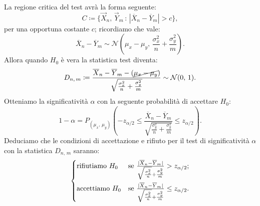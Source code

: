 \begin{defn}[$\mu_x=\mu_y=\,?,\, \sigma^2_x=\sigma^2_{x,\,0},\, \sigma^2_y=\sigma^2_{y,\,0}$]
            La regione critica del test avrà la forma seguente: \[
                C \coloneqq \big\{\vec{X}_n,\, \vec{Y}_m \,:\, |\overline{X}_n - \overline{Y}_m| > c\big\}
            ,\] per una opportuna costante $c$; ricordiamo che vale: \[
                \overline{X}_n -\overline{Y}_m \sim \mathcal{N}\left(\mu_x -\mu_y,\, \frac{\sigma_x^2}{n} 
                +\frac{\sigma_y^2}{m}\right)
            .\] Allora quando $H_0$ è vera la statistica test diventa: \[
                D_{n,\,m} \coloneqq \frac{\overline{X}_n -\overline{Y}_m -(\cancel{\mu_x -\mu_y})}
                {\sqrt{\frac{\sigma_x^2}{n} +\frac{\sigma_y^2}{m}}} \sim \mathcal{N}(0,\,1)
            .\] Otteniamo la significatività $\alpha$ con la seguente probabilità di accettare $H_0$: \[
            1-\alpha = P_{(\mu_x,\,\mu_y)}\left(-z_{\alpha /2} \leq \frac{\overline{X}_n 
            -\overline{Y}_m}{\sqrt{\frac{\sigma^2_y}{n} +\frac{\sigma^2_y}{m}}} \leq z_{\alpha /2}\right)
            .\] Deduciamo che le condizioni di accettazione e rifiuto per il test di significatività $\alpha$ 
            con la statistica $D_{n,\,m}$ saranno: \[
            \begin{cases}
                \text{rifiutiamo } H_0 & 
                \text{se $\frac{|\overline{X}_n -\overline{Y}_m|}{\sqrt{\frac{\sigma_x^2}{n}} 
                +\frac{\sigma_y^2}{m}} > z_{\alpha /2}$;} \\
                \vspace{-1em} \\
                \text{accettiamo } H_0 & 
                \text{se $\frac{|\overline{X}_n -\overline{Y}_m|}{\sqrt{\frac{\sigma_x^2}{n}} 
                +\frac{\sigma_y^2}{m}} \leq z_{\alpha /2}$.}
            \end{cases}
            \]
        \end{defn}
